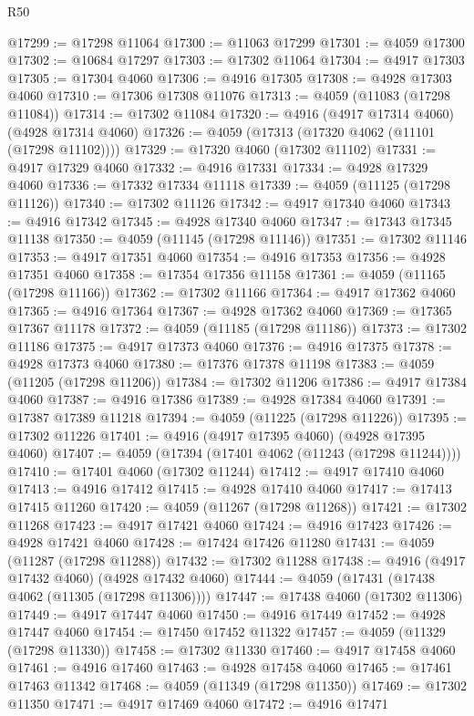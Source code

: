 \begin{lexlean}{R50}
\begin{coremodule}
@17299 := @17298 @11064
@17300 := @11063 @17299
@17301 := @4059 @17300
@17302 := @10684 @17297
@17303 := @17302 @11064
@17304 := @4917 @17303
@17305 := @17304 @4060
@17306 := @4916 @17305
@17308 := @4928 @17303 @4060
@17310 := @17306 @17308 @11076
@17313 := @4059 (@11083 (@17298 @11084))
@17314 := @17302 @11084
@17320 := @4916 (@4917 @17314 @4060) (@4928 @17314 @4060)
@17326 := @4059 (@17313 (@17320 @4062 (@11101 (@17298 @11102))))
@17329 := @17320 @4060 (@17302 @11102)
@17331 := @4917 @17329 @4060
@17332 := @4916 @17331
@17334 := @4928 @17329 @4060
@17336 := @17332 @17334 @11118
@17339 := @4059 (@11125 (@17298 @11126))
@17340 := @17302 @11126
@17342 := @4917 @17340 @4060
@17343 := @4916 @17342
@17345 := @4928 @17340 @4060
@17347 := @17343 @17345 @11138
@17350 := @4059 (@11145 (@17298 @11146))
@17351 := @17302 @11146
@17353 := @4917 @17351 @4060
@17354 := @4916 @17353
@17356 := @4928 @17351 @4060
@17358 := @17354 @17356 @11158
@17361 := @4059 (@11165 (@17298 @11166))
@17362 := @17302 @11166
@17364 := @4917 @17362 @4060
@17365 := @4916 @17364
@17367 := @4928 @17362 @4060
@17369 := @17365 @17367 @11178
@17372 := @4059 (@11185 (@17298 @11186))
@17373 := @17302 @11186
@17375 := @4917 @17373 @4060
@17376 := @4916 @17375
@17378 := @4928 @17373 @4060
@17380 := @17376 @17378 @11198
@17383 := @4059 (@11205 (@17298 @11206))
@17384 := @17302 @11206
@17386 := @4917 @17384 @4060
@17387 := @4916 @17386
@17389 := @4928 @17384 @4060
@17391 := @17387 @17389 @11218
@17394 := @4059 (@11225 (@17298 @11226))
@17395 := @17302 @11226
@17401 := @4916 (@4917 @17395 @4060) (@4928 @17395 @4060)
@17407 := @4059 (@17394 (@17401 @4062 (@11243 (@17298 @11244))))
@17410 := @17401 @4060 (@17302 @11244)
@17412 := @4917 @17410 @4060
@17413 := @4916 @17412
@17415 := @4928 @17410 @4060
@17417 := @17413 @17415 @11260
@17420 := @4059 (@11267 (@17298 @11268))
@17421 := @17302 @11268
@17423 := @4917 @17421 @4060
@17424 := @4916 @17423
@17426 := @4928 @17421 @4060
@17428 := @17424 @17426 @11280
@17431 := @4059 (@11287 (@17298 @11288))
@17432 := @17302 @11288
@17438 := @4916 (@4917 @17432 @4060) (@4928 @17432 @4060)
@17444 := @4059 (@17431 (@17438 @4062 (@11305 (@17298 @11306))))
@17447 := @17438 @4060 (@17302 @11306)
@17449 := @4917 @17447 @4060
@17450 := @4916 @17449
@17452 := @4928 @17447 @4060
@17454 := @17450 @17452 @11322
@17457 := @4059 (@11329 (@17298 @11330))
@17458 := @17302 @11330
@17460 := @4917 @17458 @4060
@17461 := @4916 @17460
@17463 := @4928 @17458 @4060
@17465 := @17461 @17463 @11342
@17468 := @4059 (@11349 (@17298 @11350))
@17469 := @17302 @11350
@17471 := @4917 @17469 @4060
@17472 := @4916 @17471

\end{coremodule}
\end{lexlean}
